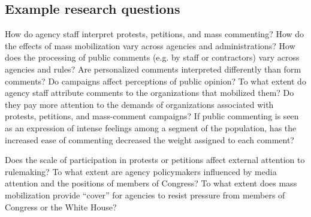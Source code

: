 \documentclass{article}
\begin{document}
\subsection*{Example research questions}
How do agency staff interpret protests, petitions, and mass commenting? How do the effects of mass mobilization vary across agencies and administrations? How does the processing of public comments (e.g. by staff or contractors) vary across agencies and rules? Are personalized comments interpreted differently than form comments? Do campaigns affect perceptions of public opinion? To what extent do agency staff attribute comments to the organizations that mobilized them? Do they pay more attention to the demands of organizations associated with protests, petitions, and mass-comment campaigns? If public commenting is seen as an expression of intense feelings among a segment of the population, has the increased ease of commenting decreased the weight assigned to each comment?

Does the scale of participation in protests or petitions affect external attention to rulemaking?  To what extent are agency policymakers influenced by media attention and the positions of members of Congress? To what extent does mass mobilization provide ``cover'' for agencies to resist pressure from members of Congress or the White House? 








\end{document}
